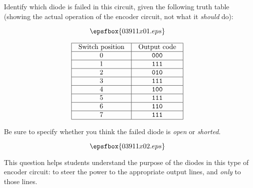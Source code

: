 

Identify which diode is failed in this circuit, given the following truth table (showing the actual operation of the encoder circuit, not what it {\it should} do):

$$\epsfbox{03911x01.eps}$$


$$\vbox{\offinterlineskip
\halign{\strut
\vrule \quad\hfil # \ \hfil & 
\vrule \quad\hfil # \ \hfil \vrule \cr
\noalign{\hrule}
%
Switch position & Output code \cr
%
\noalign{\hrule}
%
0 & {\tt 000} \cr
%
\noalign{\hrule}
%
1 & {\tt 111} \cr
%
\noalign{\hrule}
%
2 & {\tt 010} \cr
%
\noalign{\hrule}
%
3 & {\tt 111} \cr
%
\noalign{\hrule}
%
4 & {\tt 100} \cr
%
\noalign{\hrule}
%
5 & {\tt 111} \cr
%
\noalign{\hrule}
%
6 & {\tt 110} \cr
%
\noalign{\hrule}
%
7 & {\tt 111} \cr
%
\noalign{\hrule}
} %
}$$ %

Be sure to specify whether you think the failed diode is {\it open} or {\it shorted}.







$$\epsfbox{03911x02.eps}$$







This question helps students understand the purpose of the diodes in this type of encoder circuit: to steer the power to the appropriate output lines, and {\it only} to those lines.




